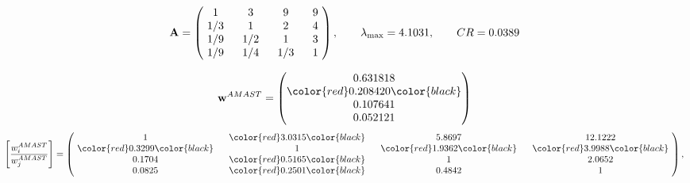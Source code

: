 \begin{example}
\begin{equation*}
\mathbf{A} =
\begin{pmatrix}
$\,\,$ 1 $\,\,$ & $\,\,$3$\,\,$ & $\,\,$9$\,\,$ & $\,\,$9 $\,\,$ \\
$\,\,$ 1/3$\,\,$ & $\,\,$ 1 $\,\,$ & $\,\,$2$\,\,$ & $\,\,$4 $\,\,$ \\
$\,\,$ 1/9$\,\,$ & $\,\,$ 1/2$\,\,$ & $\,\,$ 1 $\,\,$ & $\,\,$3 $\,\,$ \\
$\,\,$ 1/9$\,\,$ & $\,\,$ 1/4$\,\,$ & $\,\,$ 1/3$\,\,$ & $\,\,$ 1  $\,\,$ \\
\end{pmatrix},
\qquad
\lambda_{\max} =
4.1031,
\qquad
CR = 0.0389
\end{equation*}

\begin{equation*}
\mathbf{w}^{AMAST} =
\begin{pmatrix}
0.631818\\
\color{red} 0.208420\color{black} \\
0.107641\\
0.052121
\end{pmatrix}\end{equation*}
\begin{equation*}
\left[ \frac{{w}^{AMAST}_i}{{w}^{AMAST}_j} \right] =
\begin{pmatrix}
$\,\,$ 1 $\,\,$ & $\,\,$\color{red} 3.0315\color{black} $\,\,$ & $\,\,$5.8697$\,\,$ & $\,\,$12.1222$\,\,$ \\
$\,\,$\color{red} 0.3299\color{black} $\,\,$ & $\,\,$ 1 $\,\,$ & $\,\,$\color{red} 1.9362\color{black} $\,\,$ & $\,\,$\color{red} 3.9988\color{black}   $\,\,$ \\
$\,\,$0.1704$\,\,$ & $\,\,$\color{red} 0.5165\color{black} $\,\,$ & $\,\,$ 1 $\,\,$ & $\,\,$2.0652 $\,\,$ \\
$\,\,$0.0825$\,\,$ & $\,\,$\color{red} 0.2501\color{black} $\,\,$ & $\,\,$0.4842$\,\,$ & $\,\,$ 1  $\,\,$ \\
\end{pmatrix},
\end{equation*}


\end{example}
